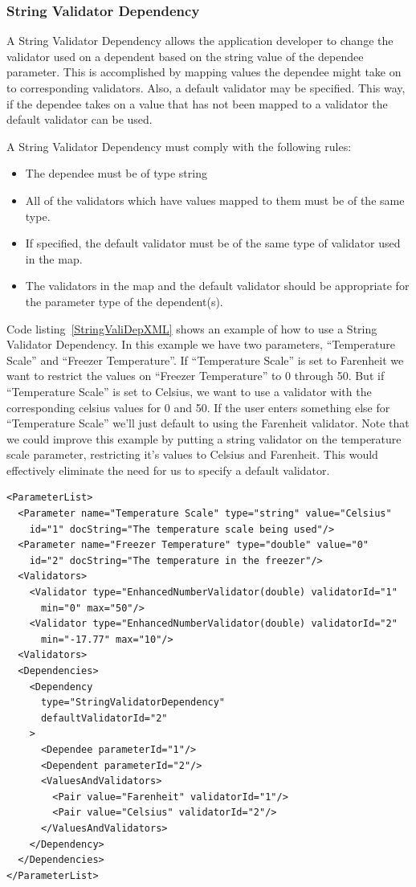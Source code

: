 \subsubsection{String Validator Dependency}
A String Validator Dependency allows the application developer to change the validator used on a dependent based on the string value of the dependee
parameter. This is accomplished by mapping values the dependee might take on to corresponding validators. Also, a default validator may be specified.
This way, if the dependee takes on a value that has not been mapped to a validator the default validator can be used. 

A String Validator Dependency must comply with the following rules:
\begin{itemize}
\item The dependee must be of type string
\item All of the validators which have values mapped to them must be of the same type.
\item If specified, the default validator must be of the same type of validator used in the map.
\item The validators in the map and the default validator should be appropriate for the parameter type of the dependent(s).
\end{itemize}

Code listing~\ref{StringValiDepXML} shows an example of how to use a String Validator Dependency. In this example we have two parameters, ``Temperature Scale''
and ``Freezer Temperature''. If ``Temperature Scale'' is set to Farenheit we want to restrict the values on ``Freezer Temperature'' to 0 through 50. But
if ``Temperature Scale'' is set to Celsius, we want to use a validator with the corresponding celsius values for 0 and 50. If the user enters something else
for ``Temperature Scale'' we'll just default to using the Farenheit validator.  Note that we could improve this example by putting a string validator on 
the temperature scale parameter, restricting it's values to Celsius and Farenheit.  This would effectively eliminate the need for us to specify a default 
validator.
\begin{lstlisting}[caption={Example usage of a String Validator Dependency}, label=StringValiDepXML]
<ParameterList>
  <Parameter name="Temperature Scale" type="string" value="Celsius"
    id="1" docString="The temperature scale being used"/>
  <Parameter name="Freezer Temperature" type="double" value="0"
    id="2" docString="The temperature in the freezer"/>
  <Validators>
    <Validator type="EnhancedNumberValidator(double) validatorId="1"
      min="0" max="50"/>
    <Validator type="EnhancedNumberValidator(double) validatorId="2"
      min="-17.77" max="10"/>
  <Validators>
  <Dependencies>
    <Dependency 
      type="StringValidatorDependency" 
      defaultValidatorId="2"
    >
      <Dependee parameterId="1"/>
      <Dependent parameterId="2"/>
      <ValuesAndValidators>
        <Pair value="Farenheit" validatorId="1"/>
        <Pair value="Celsius" validatorId="2"/>
      </ValuesAndValidators>
    </Dependency>
  </Dependencies>
</ParameterList>
\end{lstlisting}

